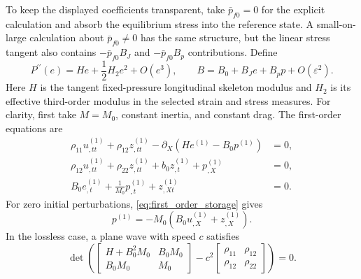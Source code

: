 \documentclass[11pt]{article}
\begin{document}
To keep the displayed coefficients transparent, take
\(\bar p_{f0}=0\) for the explicit calculation and absorb the equilibrium
stress into the reference state.  A small-on-large calculation about
\(\bar p_{f0}\ne0\) has the same structure, but the linear stress tangent also
contains \(-\bar p_{f0}B_J\) and \(-\bar p_{f0}B_p\) contributions.  Define
\begin{equation}
    P^{\prime\prime}(e)
    =H e+\frac{1}{2}H_2e^2+O\left(e^3\right),
    \qquad
    B=B_0+B_J e+B_p p+O\left(\varepsilon^2\right).
    \label{eq:oned_constitutive_expansions}
\end{equation}
Here \(H\) is the tangent fixed-pressure longitudinal skeleton modulus and
\(H_2\) is its effective third-order modulus in the selected strain and stress
measures.  For clarity, first take \(M=M_0\), constant inertia, and constant
drag.  The first-order equations are
\begin{subequations}
\label{eq:first_order_system}
\begin{align}
    \rho_{11}u^{(1)}_{,tt}+\rho_{12}z^{(1)}_{,tt}
    -\partial_X\left(H e^{(1)}-B_0p^{(1)}\right)
    & =0,
    \label{eq:first_order_total_momentum}\\
    \rho_{12}u^{(1)}_{,tt}+\rho_{22}z^{(1)}_{,tt}
    +b_0z^{(1)}_{,t}+p^{(1)}_{,X}
    & =0,
    \label{eq:first_order_relative_momentum}\\
    B_0e^{(1)}_{,t}+\frac{1}{M_0}p^{(1)}_{,t}
    +z^{(1)}_{,Xt}
    & =0.
    \label{eq:first_order_storage}
\end{align}
\end{subequations}
For zero initial perturbations, \eqref{eq:first_order_storage} gives
\begin{equation}
    p^{(1)}=-M_0\left(B_0u^{(1)}_{,X}+z^{(1)}_{,X}\right).
    \label{eq:first_order_pressure_elimination}
\end{equation}
In the lossless case, a plane wave with speed \(c\) satisfies
\begin{equation}
    \det\left(
    \begin{bmatrix}
        H+B_0^2M_0&B_0M_0\\
        B_0M_0&M_0
    \end{bmatrix}
    -c^2
    \begin{bmatrix}
        \rho_{11}&\rho_{12}\\
        \rho_{12}&\rho_{22}
    \end{bmatrix}
    \right)=0.
    \label{eq:compressional_eigenproblem}
\end{equation}
\end{document}
